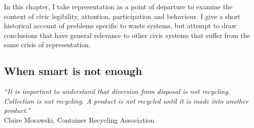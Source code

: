 \documentclass[nofonts,nols,justified,nobib]{tufte-book}
\begin{document}
In this chapter, I take representation as a point of departure to examine the context of civic legibility, attention, participation and behaviour. I give a short historical account of problems specific to waste systems, but attempt to draw conclusions that have general relevance to other civic systems that suffer from the same crisis of representation.


\subsection*{When smart is not enough}

\begin{flushright}
\begin{flushright}
\emph{``It is important to understand that diversion from disposal is not recycling. Collection is not recycling. A product is not recycled until it is made into another product.''}\cite{morawski_understanding_2009}\\
Claire Morawski, Container Recycling Association
\end{flushright}
\end{flushright}
\end{document}
